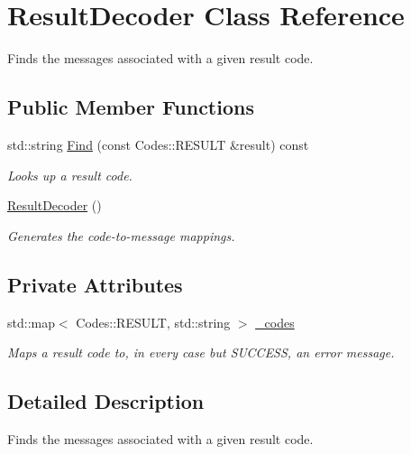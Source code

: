 \hypertarget{classResultDecoder}{
\section{ResultDecoder Class Reference}
\label{classResultDecoder}
}


Finds the messages associated with a given result code.  


\subsection*{Public Member Functions}
\begin{DoxyCompactItemize}
\item 
std::string \hyperlink{classResultDecoder_a3da4876ac5cd585a7d6176b568248b1d}{Find} (const Codes::RESULT \&result) const 
\begin{DoxyCompactList}\small\item\em Looks up a result code. \item\end{DoxyCompactList}\item 
\hypertarget{classResultDecoder_afafd3458bdbcbd7b1b95545f47151358}{
\hyperlink{classResultDecoder_afafd3458bdbcbd7b1b95545f47151358}{ResultDecoder} ()}
\label{classResultDecoder_afafd3458bdbcbd7b1b95545f47151358}

\begin{DoxyCompactList}\small\item\em Generates the code-\/to-\/message mappings. \item\end{DoxyCompactList}\end{DoxyCompactItemize}
\subsection*{Private Attributes}
\begin{DoxyCompactItemize}
\item 
std::map$<$ Codes::RESULT, std::string $>$ \hyperlink{classResultDecoder_ab19497e41c5d1a0546ed33642cad48dd}{\_\-codes}
\begin{DoxyCompactList}\small\item\em Maps a result code to, in every case but SUCCESS, an error message. \item\end{DoxyCompactList}\end{DoxyCompactItemize}


\subsection{Detailed Description}
Finds the messages associated with a given result code. 


